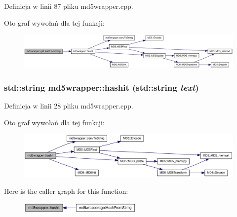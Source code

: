 Definicja w linii 87 pliku md5wrapper.cpp.

Oto graf wywołań dla tej funkcji:\nopagebreak
\begin{figure}[H]
\begin{center}
\leavevmode
\includegraphics[width=420pt]{d0/d0b/a00004_225ba5a78228b867c3f17fdba959d8e6_cgraph}
\end{center}
\end{figure}
\hypertarget{a00004_608ecf61c0ecdf2fcb772e9fd6c51d5f}{
\subsubsection[{hashit}]{\setlength{\rightskip}{0pt plus 5cm}std::string md5wrapper::hashit (std::string {\em text})}}
\label{d0/d0b/a00004_608ecf61c0ecdf2fcb772e9fd6c51d5f}




Definicja w linii 28 pliku md5wrapper.cpp.

Oto graf wywołań dla tej funkcji:\nopagebreak
\begin{figure}[H]
\begin{center}
\leavevmode
\includegraphics[width=363pt]{d0/d0b/a00004_608ecf61c0ecdf2fcb772e9fd6c51d5f_cgraph}
\end{center}
\end{figure}


Here is the caller graph for this function:\nopagebreak
\begin{figure}[H]
\begin{center}
\leavevmode
\includegraphics[width=171pt]{d0/d0b/a00004_608ecf61c0ecdf2fcb772e9fd6c51d5f_icgraph}
\end{center}
\end{figure}


